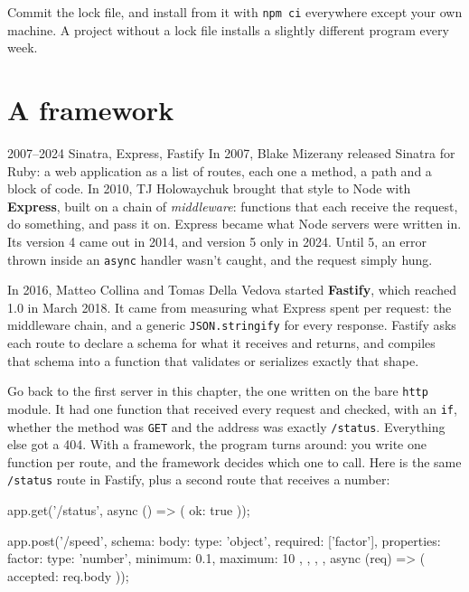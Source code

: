 Commit the lock file, and install from it with \texttt{npm ci} everywhere except
your own machine. A project without a lock file installs a slightly different
program every week.

\section{A framework}

\begin{history}{2007--2024 \textperiodcentered{} Sinatra, Express, Fastify}
In 2007, Blake Mizerany released Sinatra for Ruby: a web application as a list
of routes, each one a method, a path and a block of code. In 2010, TJ
Holowaychuk brought that style to Node with \textbf{Express}, built on a chain
of \emph{middleware}: functions that each receive the request, do something,
and pass it on. Express became what Node servers were written in. Its version 4
came out in 2014, and version 5 only in 2024. Until 5, an error thrown inside an
\texttt{async} handler wasn't caught, and the request simply hung.

In 2016, Matteo Collina and Tomas Della Vedova started \textbf{Fastify}, which
reached 1.0 in March 2018. It came from measuring what Express spent per
request: the middleware chain, and a generic \texttt{JSON.stringify} for every
response. Fastify asks each route to declare a schema for what it receives and
returns, and compiles that schema into a function that validates or serializes
exactly that shape.
\end{history}

Go back to the first server in this chapter, the one written on the bare
\texttt{http} module. It had one function that received every request and
checked, with an \texttt{if}, whether the method was \texttt{GET} and the
address was exactly \texttt{/status}. Everything else got a 404. With a
framework, the program turns around: you write one function per route, and the
framework decides which one to call. Here is the same \texttt{/status} route in
Fastify, plus a second route that receives a number:

\begin{code}
app.get('/status', async () => ({ ok: true }));

app.post('/speed', {
  schema: {
    body: {
      type: 'object',
      required: ['factor'],
      properties: { factor: { type: 'number', minimum: 0.1, maximum: 10 } },
    },
  },
}, async (req) => ({ accepted: req.body }));
\end{code}

